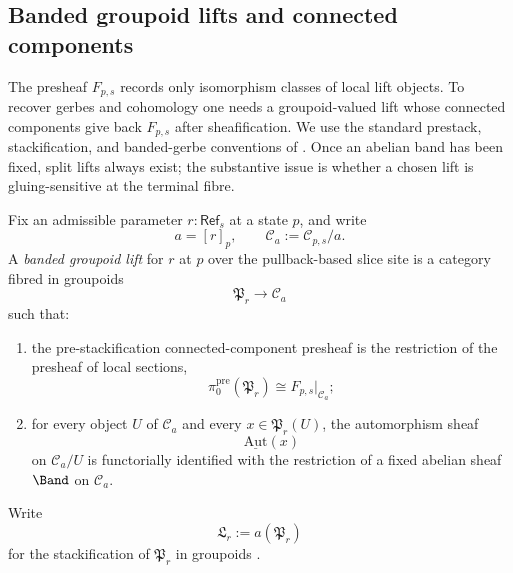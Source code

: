 \subsection{Banded groupoid lifts and connected components}

The presheaf $F_{p,s}$ records only isomorphism classes of local lift objects. To recover gerbes and cohomology one needs a groupoid-valued lift whose connected components give back $F_{p,s}$ after sheafification. We use the standard prestack, stackification, and banded-gerbe conventions of \cite{Giraud1971,MacLaneMoerdijk1994,Moerdijk2002,StacksProject}. Once an abelian band has been fixed, split lifts always exist; the substantive issue is whether a chosen lift is gluing-sensitive at the terminal fibre.

\begin{definition}\label{def:banded-groupoid-lift}
Fix an admissible parameter $r:\mathsf{Ref}_s$ at a state $p$, and write
\[
a=[r]_p,
\qquad
\mathcal C_a:=\mathcal C_{p,s}/a.
\]
A \emph{banded groupoid lift} for $r$ at $p$ over the pullback-based slice site is a category fibred in groupoids
\[
\mathfrak P_r\to \mathcal C_a
\]
such that:
\begin{enumerate}[label=(\roman*),nosep]
\item the pre-stackification connected-component presheaf is the restriction of the presheaf of local sections,
\[
\pi_0^{\mathrm{pre}}(\mathfrak P_r)\cong F_{p,s}|_{\mathcal C_a};
\]
\item for every object $U$ of $\mathcal C_a$ and every $x\in \mathfrak P_r(U)$, the automorphism sheaf
\[
\underline{\mathrm{Aut}}(x)
\]
on $\mathcal C_a/U$ is functorially identified with the restriction of a fixed abelian sheaf $\Band$ on $\mathcal C_a$.
\end{enumerate}
Write
\[
\mathfrak L_r:=a(\mathfrak P_r)
\]
for the stackification of $\mathfrak P_r$ in groupoids \cite[Tag 02ZP]{StacksProject}.
\end{definition}

